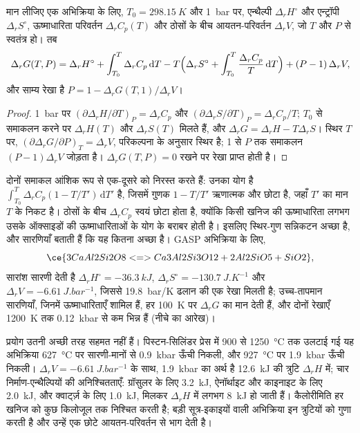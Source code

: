 \begin{theorem}[तापमान $T$ और दाब $P$ पर अभिक्रिया की गिब्स ऊर्जा]\label{thm:b3:petrological-thermodynamics:dg}
मान लीजिए एक अभिक्रिया के लिए, $T_0 = \qty{298.15}{K}$ और \qty{1}{bar} पर,
एन्थैल्पी $\Delta_rH^\circ$ और एन्ट्रॉपी $\Delta_rS^\circ$, ऊष्माधारिता
परिवर्तन $\Delta_rC_p(T)$ और ठोसों के बीच आयतन-परिवर्तन $\Delta_rV$,
जो $T$ और $P$ से स्वतंत्र हो। तब
\[
  \Delta_rG(T, P) = \Delta_rH^\circ + \int_{T_0}^{T}\Delta_rC_p\,\mathrm dT
  - T\Bigl(\Delta_rS^\circ + \int_{T_0}^{T}\frac{\Delta_rC_p}{T}\,\mathrm dT\Bigr)
  + (P - 1)\,\Delta_rV ,
\]
और साम्य रेखा है $P = 1 - \Delta_rG(T, 1)/\Delta_rV$।
\end{theorem}

\begin{proof}
\qty{1}{bar} पर $(\partial\Delta_rH/\partial T)_P = \Delta_rC_p$ और
$(\partial\Delta_rS/\partial T)_P = \Delta_rC_p/T$; $T_0$ से समाकलन करने पर
$\Delta_rH(T)$ और $\Delta_rS(T)$ मिलते हैं, और $\Delta_rG = \Delta_rH -
T\Delta_rS$। स्थिर $T$ पर, $(\partial\Delta_rG/\partial P)_T = \Delta_rV$,
परिकल्पना के अनुसार स्थिर है; 1 से $P$ तक समाकलन $(P - 1)\Delta_rV$ जोड़ता है।
$\Delta_rG(T, P) = 0$ रखने पर रेखा प्राप्त होती है।
\end{proof}

दोनों समाकल आंशिक रूप से एक-दूसरे को निरस्त करते हैं: उनका योग है $\int_{T_0}^T\Delta_rC_p(1 -
T/T')\,\mathrm dT'$ है, जिसमें गुणक $1 - T/T'$ ऋणात्मक और छोटा है,
जहाँ $T'$ का मान $T$ के निकट है। ठोसों के बीच $\Delta_rC_p$ स्वयं छोटा होता है,
क्योंकि किसी खनिज की ऊष्माधारिता लगभग उसके ऑक्साइडों की ऊष्माधारिताओं के
योग के बराबर होती है। इसलिए स्थिर-गुण सन्निकटन अच्छा है, और सारणियाँ
बताती हैं कि यह कितना अच्छा है। GASP अभिक्रिया के लिए,
\[
  \ce{3 CaAl2Si2O8 <=> Ca3Al2Si3O12 + 2 Al2SiO5 + SiO2},
\]
सारांश सारणी देती है $\Delta_rH^\circ = \qty{-36.3}{kJ}$,
$\Delta_rS^\circ = \qty{-130.7}{J.K^{-1}}$ और $\Delta_rV =
\qty{-6.61}{J.bar^{-1}}$, जिससे \qty{19.8}{bar/K} ढलान की एक रेखा मिलती है; उच्च-तापमान
सारणियाँ, जिनमें ऊष्माधारिताएँ शामिल हैं, हर \qty{100}{K} पर
$\Delta_rG$ का मान देती हैं, और दोनों रेखाएँ
\qty{1200}{K} तक \qty{0.12}{kbar} से कम भिन्न हैं (नीचे का आरेख)।

प्रयोग उतनी अच्छी तरह सहमत नहीं हैं। पिस्टन-सिलिंडर प्रेस में 900 से
\qty{1250}{\celsius} तक उलटाई गई यह अभिक्रिया \qty{627}{\celsius} पर सारणी-मानों से
\qty{0.9}{kbar} ऊँची निकली, और \qty{927}{\celsius} पर \qty{1.9}{kbar} ऊँची
निकली। $\Delta_rV = \qty{-6.61}{J.bar^{-1}}$ के साथ,
\qty{1.9}{kbar} का अर्थ है \qty{12.6}{kJ} की त्रुटि $\Delta_rH$ में;
चार निर्माण-एन्थैल्पियों की अनिश्चितताएँ: ग्रॉसुलर के लिए \qty{3.2}{kJ},
ऐनॉर्थाइट और काइनाइट के लिए \qty{2.0}{kJ}, और
क्वार्ट्ज़ के लिए \qty{1.0}{kJ}, मिलकर $\Delta_rH$ में लगभग \qty{8}{kJ} हो जाती हैं। कैलोरीमिति हर
खनिज को कुछ किलोजूल तक निश्चित करती है; बड़ी सूत्र-इकाइयों वाली अभिक्रिया इन त्रुटियों को गुणा करती है
और उन्हें एक छोटे आयतन-परिवर्तन से भाग देती है।

